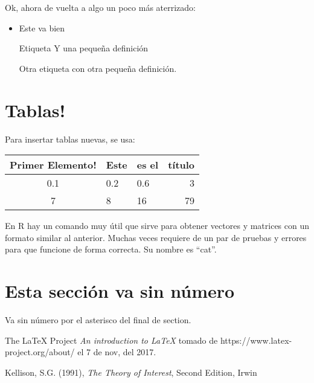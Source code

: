\documentclass{article}
\begin{document}
\newpage
Ok, ahora de vuelta a algo un poco m\'as aterrizado:

\begin{itemize}
	\item Este va bien
\item[Etiqueta] Y una peque\~na definici\'on
\item[Otra etiqueta] con otra peque\~na definici\'on.
\end{itemize}


\section{Tablas!}
Para insertar tablas nuevas, se usa:

\begin{center}
\begin{tabular}{|c|l|l|r|}
	\hline
Primer Elemento! & Este & es el & t\'itulo \\ \hline\hline
	                              0.1                                & 0.2  & 0.6   &        3 \\ \hline
	                               7                                 & 8    & 16    &       79 \\ \hline
\end{tabular}
\end{center}


En R hay un comando muy \'util que sirve para obtener vectores y matrices con un formato similar al anterior. Muchas veces requiere de un par de pruebas y errores para que funcione de forma correcta. Su nombre es ``cat''.

\section*{Esta sección va sin número}
Va sin n\'umero por el asterisco del final de section.





\begin{thebibliography}{10}
 The LaTeX Project  {\em An introduction to LaTeX} tomado de {https://www.latex-project.org/about/} el 7 de nov, del 2017.

 Kellison, S.G. (1991), {\em The Theory of Interest}, Second Edition, Irwin
\end{thebibliography}
\end{document}
